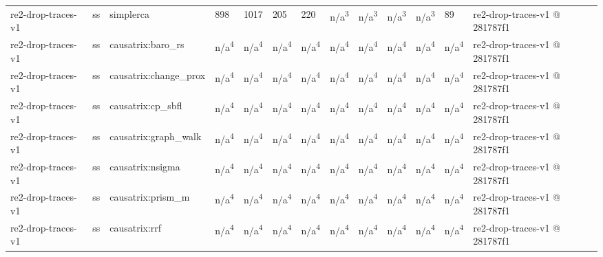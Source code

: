 \begin{table}[t]
\begin{tabular}{lllllllllllll}
re2-drop-traces-v1 & ss & simplerca & 898 & 1017 & 205 & 220 & n/a\textsuperscript{3} & n/a\textsuperscript{3} & n/a\textsuperscript{3} & n/a\textsuperscript{3} & 89 & re2-drop-traces-v1 @ 281787f1 \\
re2-drop-traces-v1 & ss & causatrix:baro\_rs & n/a\textsuperscript{4} & n/a\textsuperscript{4} & n/a\textsuperscript{4} & n/a\textsuperscript{4} & n/a\textsuperscript{4} & n/a\textsuperscript{4} & n/a\textsuperscript{4} & n/a\textsuperscript{4} & n/a\textsuperscript{4} & re2-drop-traces-v1 @ 281787f1 \\
re2-drop-traces-v1 & ss & causatrix:change\_prox & n/a\textsuperscript{4} & n/a\textsuperscript{4} & n/a\textsuperscript{4} & n/a\textsuperscript{4} & n/a\textsuperscript{4} & n/a\textsuperscript{4} & n/a\textsuperscript{4} & n/a\textsuperscript{4} & n/a\textsuperscript{4} & re2-drop-traces-v1 @ 281787f1 \\
re2-drop-traces-v1 & ss & causatrix:cp\_sbfl & n/a\textsuperscript{4} & n/a\textsuperscript{4} & n/a\textsuperscript{4} & n/a\textsuperscript{4} & n/a\textsuperscript{4} & n/a\textsuperscript{4} & n/a\textsuperscript{4} & n/a\textsuperscript{4} & n/a\textsuperscript{4} & re2-drop-traces-v1 @ 281787f1 \\
re2-drop-traces-v1 & ss & causatrix:graph\_walk & n/a\textsuperscript{4} & n/a\textsuperscript{4} & n/a\textsuperscript{4} & n/a\textsuperscript{4} & n/a\textsuperscript{4} & n/a\textsuperscript{4} & n/a\textsuperscript{4} & n/a\textsuperscript{4} & n/a\textsuperscript{4} & re2-drop-traces-v1 @ 281787f1 \\
re2-drop-traces-v1 & ss & causatrix:nsigma & n/a\textsuperscript{4} & n/a\textsuperscript{4} & n/a\textsuperscript{4} & n/a\textsuperscript{4} & n/a\textsuperscript{4} & n/a\textsuperscript{4} & n/a\textsuperscript{4} & n/a\textsuperscript{4} & n/a\textsuperscript{4} & re2-drop-traces-v1 @ 281787f1 \\
re2-drop-traces-v1 & ss & causatrix:prism\_m & n/a\textsuperscript{4} & n/a\textsuperscript{4} & n/a\textsuperscript{4} & n/a\textsuperscript{4} & n/a\textsuperscript{4} & n/a\textsuperscript{4} & n/a\textsuperscript{4} & n/a\textsuperscript{4} & n/a\textsuperscript{4} & re2-drop-traces-v1 @ 281787f1 \\
re2-drop-traces-v1 & ss & causatrix:rrf & n/a\textsuperscript{4} & n/a\textsuperscript{4} & n/a\textsuperscript{4} & n/a\textsuperscript{4} & n/a\textsuperscript{4} & n/a\textsuperscript{4} & n/a\textsuperscript{4} & n/a\textsuperscript{4} & n/a\textsuperscript{4} & re2-drop-traces-v1 @ 281787f1 \\

\end{tabular}
\end{table}
